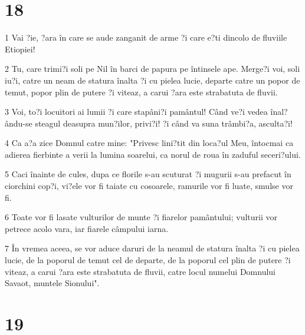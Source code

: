 \chapter{18}

\par 1 Vai ?ie, ?ara în care se aude zanganit de arme ?i care e?ti dincolo de fluviile Etiopiei!
\par 2 Tu, care trimi?i soli pe Nil în barci de papura pe întinsele ape. Merge?i voi, soli iu?i, catre un neam de statura înalta ?i cu pielea lucie, departe catre un popor de temut, popor plin de putere ?i viteaz, a carui ?ara este strabatuta de fluvii.
\par 3 Voi, to?i locuitori ai lumii ?i care stapâni?i pamântul! Când ve?i vedea înal?ându-se steagul deasupra mun?ilor, privi?i! ?i când va suna trâmbi?a, asculta?i!
\par 4 Ca a?a zice Domnul catre mine: "Privesc lini?tit din loca?ul Meu, întocmai ca adierea fierbinte a verii la lumina soarelui, ca norul de roua în zaduful seceri?ului.
\par 5 Caci înainte de cules, dupa ce florile s-au scuturat ?i mugurii s-au prefacut în ciorchini cop?i, vi?ele vor fi taiate cu cosoarele, ramurile vor fi luate, smulse vor fi.
\par 6 Toate vor fi lasate vulturilor de munte ?i fiarelor pamântului; vulturii vor petrece acolo vara, iar fiarele câmpului iarna.
\par 7 În vremea aceea, se vor aduce daruri de la neamul de statura înalta ?i cu pielea lucie, de la poporul de temut cel de departe, de la poporul cel plin de putere ?i viteaz, a carui ?ara este strabatuta de fluvii, catre locul numelui Domnului Savaot, muntele Sionului".

\chapter{19}

